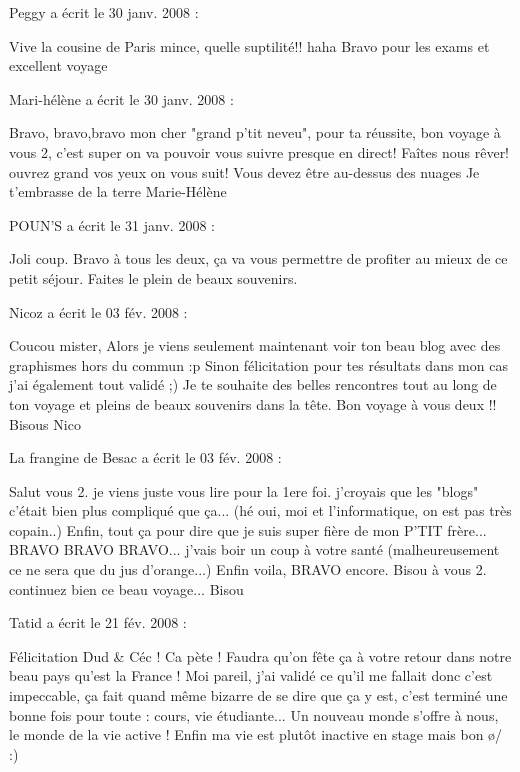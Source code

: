  \medskip
Peggy a écrit le 30 janv. 2008 :
\begin{displayquote}
Vive la cousine de Paris mince, quelle suptilité!! haha
Bravo pour les exams et excellent voyage
\end{displayquote}

 \medskip
Mari-hélène a écrit le 30 janv. 2008 :
\begin{displayquote}
Bravo, bravo,bravo mon cher "grand p'tit neveu", pour ta réussite, bon voyage à vous 2, c'est super on va pouvoir vous suivre presque en direct! Faîtes nous rêver! ouvrez grand vos yeux on vous suit!
Vous devez être au-dessus des nuages
Je t'embrasse de la terre 
Marie-Hélène
\end{displayquote}

 \medskip
POUN'S a écrit le 31 janv. 2008 :
\begin{displayquote}
Joli coup.
Bravo à tous les deux, ça va vous permettre de profiter au mieux de ce petit séjour. Faites le plein de beaux souvenirs.
\end{displayquote}

 \medskip
Nicoz a écrit le 03 fév. 2008 :
\begin{displayquote}
Coucou mister,
Alors je viens seulement maintenant voir ton beau blog avec des graphismes hors du commun :p
Sinon félicitation pour tes résultats dans mon cas j'ai également tout validé ;)
Je te souhaite des belles rencontres tout au long de ton voyage et pleins de beaux souvenirs dans la tête.
Bon voyage à vous deux !!
Bisous
Nico
\end{displayquote}

 \medskip
La frangine de Besac a écrit le 03 fév. 2008 :
\begin{displayquote}
Salut vous 2. je viens juste vous lire pour la 1ere foi. j'croyais que les "blogs" c'était bien plus compliqué que ça... (hé oui, moi et l'informatique, on est pas très copain..)
Enfin, tout ça pour dire que je suis super fière de mon P'TIT frère... BRAVO BRAVO BRAVO... j'vais boir un coup à votre santé (malheureusement ce ne sera que du jus d'orange...)
Enfin voila, BRAVO encore. 
Bisou à vous 2. continuez bien ce beau voyage...
Bisou
\end{displayquote}

 \medskip
Tatid a écrit le 21 fév. 2008 :
\begin{displayquote}
Félicitation Dud & Céc ! Ca pète !
Faudra qu'on fête ça à votre retour dans notre beau pays qu'est la France ! 
Moi pareil, j'ai validé ce qu'il me fallait donc c'est impeccable, ça fait quand même bizarre de se dire que ça y est, c'est terminé une bonne fois pour toute : cours, vie étudiante... Un nouveau monde s'offre à nous, le monde de la vie active ! Enfin ma vie est plutôt inactive en stage mais bon \o/ :)
\end{displayquote}

